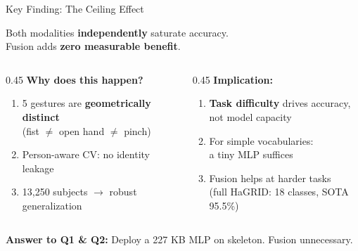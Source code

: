 \documentclass[aspectratio=169]{beamer}
\begin{document}
\begin{frame}{Key Finding: The Ceiling Effect}
    \centering
    \vspace{0.3em}

    {\large Both modalities \textbf{independently} saturate accuracy.\\[0.2em]
    Fusion adds \textbf{zero measurable benefit}.}

    \vspace{1em}
    \begin{columns}[T]
    \begin{column}{0.45\textwidth}
        \textbf{Why does this happen?}
        \begin{enumerate}
            \setlength\itemsep{0.3em}
            \item 5 gestures are \textbf{geometrically distinct}\\{\scriptsize (fist $\neq$ open hand $\neq$ pinch)}
            \item Person-aware CV: no identity leakage
            \item 13,250 subjects $\to$ robust generalization
        \end{enumerate}
    \end{column}
    \begin{column}{0.45\textwidth}
        \textbf{Implication:}
        \begin{enumerate}
            \setlength\itemsep{0.3em}
            \item \textbf{Task difficulty} drives accuracy,\\not model capacity
            \item For simple vocabularies:\\a tiny MLP suffices
            \item Fusion helps at harder tasks\\{\scriptsize (full HaGRID: 18 classes, SOTA 95.5\%)}
        \end{enumerate}
    \end{column}
    \end{columns}

    \vspace{0.8em}
    \begin{block}{}
        \centering
        \textbf{Answer to Q1 \& Q2:} Deploy a 227 KB MLP on skeleton. Fusion unnecessary.
    \end{block}
\end{frame}
\end{document}
